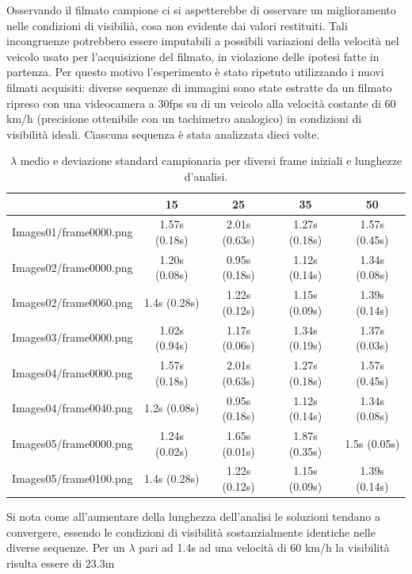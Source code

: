 \documentclass[12pt]{report}
\begin{document}
\noindent Osservando il filmato campione ci si aspetterebbe di osservare un miglioramento nelle condizioni di visibili\`a, cosa non evidente dai valori restituiti. Tali incongruenze potrebbero essere imputabili a possibili variazioni della velocit\`a nel veicolo usato per l'acquisizione del filmato, in violazione delle ipotesi fatte in partenza. Per questo motivo l'esperimento \`e stato ripetuto utilizzando i nuovi filmati acquisiti: diverse sequenze di immagini sono state estratte da un filmato ripreso con una videocamera a 30fps su di un veicolo alla velocit\`a costante di 60 km/h (precisione ottenibile con un tachimetro analogico) in condizioni di visibilit\`a ideali. Ciascuna sequenza \`e stata analizzata dieci volte.\\

\begin{table}[H]
\centering
\begin{tabular}{|c|c|c|c|c|}
	\hline
	& 15 & 25 & 35 & 50 \\ \hline
	Images01/frame0000.png & 1.57s (0.18s) & 2.01s (0.63s) & 1.27s (0.18s) & 1.57s (0.45s) \\ \hline
	Images02/frame0000.png & 1.20s (0.08s) & 0.95s (0.18s) & 1.12s (0.14s) & 1.34s (0.08s) \\ \hline
	Images02/frame0060.png & 1.4s (0.28s) & 1.22s (0.12s) & 1.15s (0.09s) & 1.39s (0.14s)\\ \hline
	Images03/frame0000.png & 1.02s (0.94s) & 1.17s (0.06s) & 1.34s (0.19s) & 1.37s (0.03s) \\ \hline
	Images04/frame0000.png & 1.57s (0.18s) & 2.01s (0.63s) & 1.27s (0.18s) & 1.57s (0.45s) \\ \hline
	Images04/frame0040.png & 1.2s (0.08s) & 0.95s (0.18s) & 1.12s (0.14s) & 1.34s (0.08s) \\ \hline
	Images05/frame0000.png & 1.24s (0.02s) & 1.65s (0.01s) & 1.87s (0.35s) & 1.5s (0.05s) \\ \hline
	Images05/frame0100.png & 1.4s (0.28s) & 1.22s (0.12s) & 1.15s (0.09s) & 1.39s (0.14s) \\ \hline
\end{tabular}
\caption{$\lambda$ medio e deviazione standard campionaria per diversi frame iniziali e lunghezze d'analisi.}
\end{table}

\noindent Si nota come all'aumentare della lunghezza dell'analisi le soluzioni tendano a convergere, essendo le condizioni di visibilit\`a sostanzialmente identiche nelle diverse sequenze. Per un $\lambda$ pari ad 1.4s ad una velocit\`a di 60 km/h la visibilit\`a risulta essere di 23.3m\\
\end{document}
